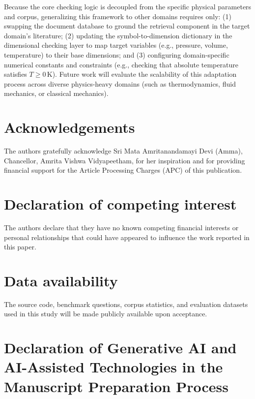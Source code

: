 \documentclass[a4paper,fleqn]{cas-sc}
\begin{document}
Because the core checking logic is decoupled from the specific physical parameters and corpus, generalizing this framework to other domains requires only: (1) swapping the document database to ground the retrieval component in the target domain's literature; (2) updating the symbol-to-dimension dictionary in the dimensional checking layer to map target variables (e.g., pressure, volume, temperature) to their base dimensions; and (3) configuring domain-specific numerical constants and constraints (e.g., checking that absolute temperature satisfies $T \ge 0$\,K). Future work will evaluate the scalability of this adaptation process across diverse physics-heavy domains (such as thermodynamics, fluid mechanics, or classical mechanics).

\section*{Acknowledgements}
The authors gratefully acknowledge Sri Mata Amritanandamayi Devi (Amma), Chancellor, Amrita Vishwa Vidyapeetham, for her inspiration and for providing financial support for the Article Processing Charges (APC) of this publication.

\printcredits

\section*{Declaration of competing interest}
The authors declare that they have no known competing financial interests or personal relationships that could have appeared to influence the work reported in this paper.

\section*{Data availability}
The source code, benchmark questions, corpus statistics, and evaluation datasets used in this study will be made publicly available upon acceptance.

\section*{Declaration of Generative AI and AI-Assisted Technologies in the Manuscript Preparation Process}
\end{document}
